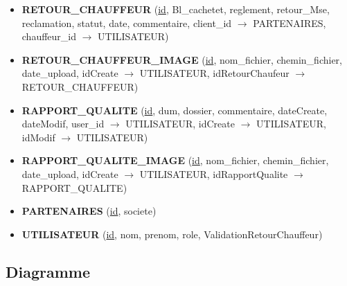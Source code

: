 \documentclass[12pt,a4paper]{article}
\begin{document}
\begin{itemize}[leftmargin=1.5em]
\item \textbf{RETOUR\_CHAUFFEUR} (\underline{id}, Bl\_cachetet, reglement, retour\_Mse, reclamation, statut, date, commentaire, client\_id $\rightarrow$ PARTENAIRES, chauffeur\_id $\rightarrow$ UTILISATEUR)
\item \textbf{RETOUR\_CHAUFFEUR\_IMAGE} (\underline{id}, nom\_fichier, chemin\_fichier, date\_upload, idCreate $\rightarrow$ UTILISATEUR, idRetourChaufeur $\rightarrow$ RETOUR\_CHAUFFEUR)
\item \textbf{RAPPORT\_QUALITE} (\underline{id}, dum, dossier, commentaire, dateCreate, dateModif, user\_id $\rightarrow$ UTILISATEUR, idCreate $\rightarrow$ UTILISATEUR, idModif $\rightarrow$ UTILISATEUR)
\item \textbf{RAPPORT\_QUALITE\_IMAGE} (\underline{id}, nom\_fichier, chemin\_fichier, date\_upload, idCreate $\rightarrow$ UTILISATEUR, idRapportQualite $\rightarrow$ RAPPORT\_QUALITE)
\item \textbf{PARTENAIRES} (\underline{id}, societe)
\item \textbf{UTILISATEUR} (\underline{id}, nom, prenom, role, ValidationRetourChauffeur)
\end{itemize}

\subsection{Diagramme}
\end{document}

